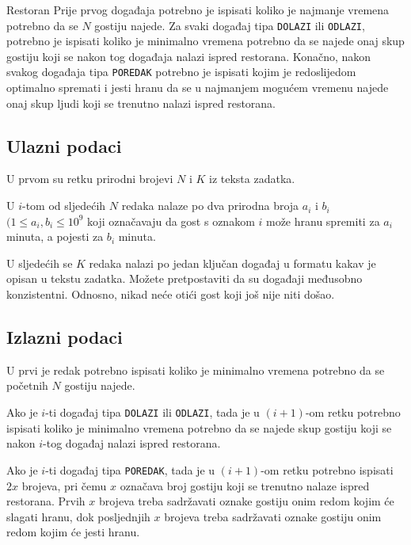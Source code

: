\begin{statement}[
  problempoints=100,
  timelimit=1 sekunda,
  memorylimit=512 MiB,
]{Restoran}
Prije prvog događaja potrebno je ispisati koliko je najmanje vremena potrebno
da se $N$ gostiju najede. Za svaki događaj tipa \texttt{DOLAZI} ili
\texttt{ODLAZI}, potrebno je ispisati koliko je minimalno vremena potrebno da
se najede onaj skup gostiju koji se nakon tog događaja nalazi ispred
restorana. Konačno, nakon svakog događaja tipa \texttt{POREDAK} potrebno je
ispisati kojim je redoslijedom optimalno spremati i jesti hranu da se u
najmanjem mogućem vremenu najede onaj skup ljudi koji se trenutno nalazi
ispred restorana.

\subsection*{Ulazni podaci}
U prvom su retku prirodni brojevi $N$ i $K$ iz teksta zadatka.

U $i$-tom od sljedećih $N$ redaka nalaze po dva prirodna broja $a_i$ i $b_i$
$(1 \le a_i, b_i \le 10^9$ koji označavaju da gost s oznakom $i$ može hranu
spremiti za $a_i$ minuta, a pojesti za $b_i$ minuta.

U sljedećih se $K$ redaka nalazi po jedan ključan događaj u formatu kakav
je opisan u tekstu zadatka. Možete pretpostaviti da su događaji međusobno
konzistentni. Odnosno, nikad neće otići gost koji još nije niti došao.

\clearpage
\subsection*{Izlazni podaci}
U prvi je redak potrebno ispisati koliko je minimalno vremena potrebno da se
početnih $N$ gostiju najede.

Ako je $i$-ti događaj tipa \texttt{DOLAZI} ili \texttt{ODLAZI}, tada je u
$(i+1)$-om retku potrebno ispisati koliko je minimalno vremena potrebno da se
najede skup gostiju koji se nakon $i$-tog događaj nalazi ispred restorana.

Ako je $i$-ti događaj tipa \texttt{POREDAK}, tada je u $(i+1)$-om retku potrebno
ispisati $2x$ brojeva, pri čemu $x$ označava broj gostiju koji se trenutno
nalaze ispred restorana. Prvih $x$ brojeva treba sadržavati oznake gostiju onim
redom kojim će slagati hranu, dok posljednjih $x$ brojeva treba sadržavati
oznake gostiju onim redom kojim će jesti hranu.


\end{statement}
